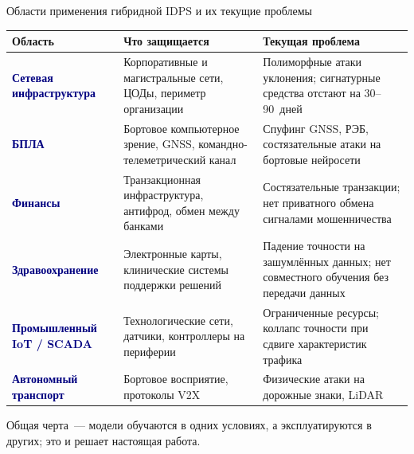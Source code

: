 \documentclass[10pt,aspectratio=169]{beamer}
\newcommand{\bn}[1]{\textcolor{navy}{\textbf{#1}}}
\begin{document}
\begin{frame}{Области применения гибридной IDPS и их текущие проблемы}
\scriptsize
\begin{tabular}{@{}p{2.7cm}p{6.0cm}p{5.5cm}@{}}
\toprule
\textbf{Область} & \textbf{Что защищается} & \textbf{Текущая проблема} \\
\midrule
\bn{Сетевая инфраструктура} & Корпоративные и магистральные сети,
ЦОДы, периметр организации & Полиморфные атаки уклонения;
сигнатурные средства отстают на 30--90~дней \\
\midrule
\bn{БПЛА} & Бортовое компьютерное зрение, GNSS,
командно-телеметрический канал & Спуфинг GNSS, РЭБ,
состязательные атаки на бортовые нейросети \\
\midrule
\bn{Финансы} & Транзакционная инфраструктура, антифрод,
обмен между банками & Состязательные транзакции; нет
приватного обмена сигналами мошенничества \\
\midrule
\bn{Здравоохранение} & Электронные карты, клинические
системы поддержки решений & Падение точности на зашумлённых
данных; нет совместного обучения без передачи данных \\
\midrule
\bn{Промышленный IoT / SCADA} & Технологические сети,
датчики, контроллеры на периферии & Ограниченные ресурсы;
коллапс точности при сдвиге характеристик трафика \\
\midrule
\bn{Автономный транспорт} & Бортовое восприятие, протоколы V2X &
Физические атаки на дорожные знаки, LiDAR \\
\bottomrule
\end{tabular}
\smallskip
\begin{block}{}
\scriptsize Общая черта~--- модели обучаются в одних условиях, а
эксплуатируются в других; это и решает настоящая работа.
\end{block}
\end{frame}
\end{document}
